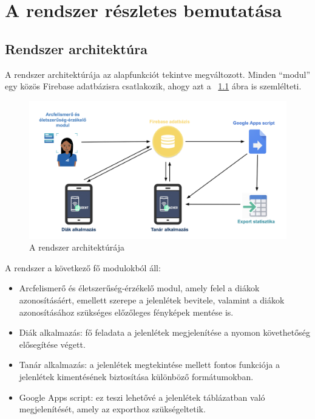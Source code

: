 \chapter{A rendszer részletes bemutatása} \label{chapter7}

\section{Rendszer architektúra}

A rendszer architektúrája az alapfunkciót tekintve megváltozott. Minden \enquote{modul} egy közös Firebase adatbázisra csatlakozik, ahogy azt a ~\ref{fig:arch1} ábra is szemlélteti.

\begin{figure}[htbp]
	\includegraphics[width=\textwidth]{figures/architecture.png}
	\caption{A rendszer architektúrája}
	\label{fig:arch1}
\end{figure}

A rendszer a következő fő modulokból áll:

\begin{itemize}
    \item Arcfelismerő és életszerűség-érzékelő modul, amely felel a diákok azonosításáért, emellett szerepe a jelenlétek bevitele, valamint a diákok azonosításához szükséges előzőleges fényképek mentése is.
    \item Diák alkalmazás: fő feladata a jelenlétek megjelenítése a nyomon követhetőség elősegítése végett.
    \item Tanár alkalmazás: a jelenlétek megtekintése mellett fontos funkciója a jelenlétek kimentésének biztosítása különböző formátumokban.
    \item Google Apps script: ez teszi lehetővé a jelenlétek táblázatban való megjelenítését, amely az exporthoz szükségeltetik.
\end{itemize}



